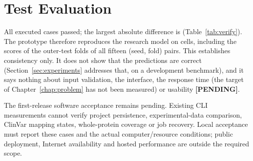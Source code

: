 \begin{table}[htbp]
  \centering
  \caption{Executed test cases: agreement of the prototype with the research runner. The tolerance is $10^{-9}$.}\label{tab:verify}
  
\end{table}

\section{Test Evaluation}\label{sec:testeval}
All \nVerNChecks{} executed cases passed; the largest absolute difference is \nVerMax{} (Table~\ref{tab:verify}). The prototype therefore reproduces the research model on \nVerCells{} cells,
including the scores of the outer-test folds of all fifteen (seed, fold) pairs. This establishes consistency only. It does not show that the predictions are correct (Section~\ref{sec:experiments} addresses that, on a development
benchmark), and it says nothing about input validation, the interface, the response time (the target of Chapter~\ref{chap:problem} has not been measured) or usability \textbf{[PENDING]}.


The first-release software acceptance remains pending. Existing CLI measurements cannot verify
project persistence, experimental-data comparison, ClinVar mapping states, whole-protein coverage or
job recovery. Local acceptance must report these cases and the actual computer/resource conditions;
public deployment, Internet availability and hosted performance are outside the required scope.
